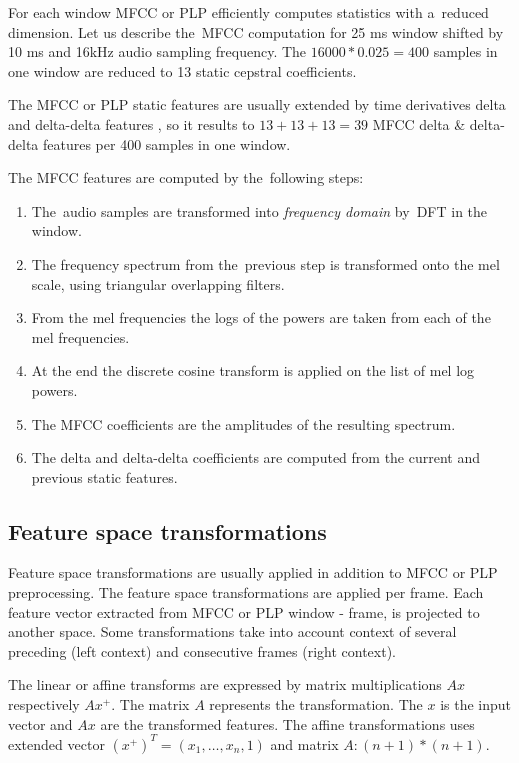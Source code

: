 For each window \ac{MFCC} or \ac{PLP} efficiently computes statistics with a~reduced dimension. 
Let us describe the~\ac{MFCC} computation for 25 ms window shifted by 10 ms and 16kHz audio sampling frequency. 
The $16000 * 0.025 = 400$ samples in one window are reduced to 13 static cepstral coefficients.

The \ac{MFCC} or \ac{PLP} static features are usually extended 
by time derivatives delta and delta-delta features \cite{psutka2001comparison},
so it results to $13 + 13 + 13 = 39$ \ac{MFCC} delta \& delta-delta features 
per 400 samples in one window.

The \ac{MFCC} features are computed by the~following steps:

\small{\begin{enumerate}
    \item The~audio samples are transformed into {\it frequency domain}\/ by~\ac{DFT} in the window.
    \item The frequency spectrum from the~previous step is transformed onto the mel scale, 
        using triangular overlapping filters.
    \item From the mel frequencies the logs of the powers are taken from each of the mel frequencies.
    \item At the end the discrete cosine transform is applied on the list of mel log powers.
    \item The \ac{MFCC} coefficients are the amplitudes of the resulting spectrum.
    \item The delta and delta-delta coefficients are computed from the current and previous static features.
\end{enumerate}

\subsection*{Feature space transformations}
Feature space transformations are usually applied in addition to \ac{MFCC} or \ac{PLP} preprocessing.
The feature space transformations are applied per frame. 
Each feature vector extracted from \ac{MFCC}
or \ac{PLP} window - frame, is projected to another space.
Some transformations take into account context of several 
preceding (left context) and consecutive frames (right context).

The linear or affine transforms are expressed by matrix multiplications $Ax$ respectively $Ax^+$.
The matrix $A$ represents the transformation. 
The $x$ is the input vector and $Ax$ are the transformed features.
The affine transformations uses extended vector $(x^+)^T = (x_1, \ldots, x_n, 1)$ and matrix $A: (n+1)*(n+1)$.

}
